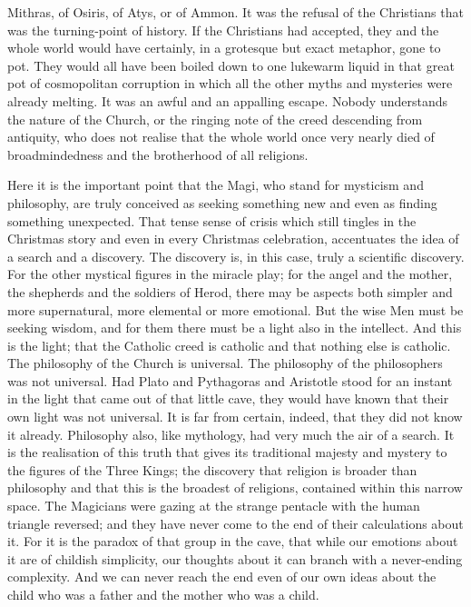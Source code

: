 Mithras, of Osiris, of Atys, or of Ammon. It was the refusal of the Christians that was the turning-point of history. If the Christians had accepted, they and the whole world would have certainly, in a grotesque but exact metaphor, gone to pot. They would all have been boiled down to one lukewarm liquid in that great pot of cosmopolitan corruption in which all the other myths and mysteries were already melting. It was an awful and an appalling escape. Nobody understands the nature of the Church, or the ringing note of the creed descending from antiquity, who does not realise that the whole world once very nearly died of broadmindedness and the brotherhood of all religions.

Here it is the important point that the Magi, who stand for mysticism and philosophy, are truly conceived as seeking something new and even as finding something unexpected. That tense sense of crisis which still tingles in the Christmas story and even in every Christmas celebration, accentuates the idea of a search and a discovery. The discovery is, in this case, truly a scientific discovery. For the other mystical figures in the miracle play; for the angel and the mother, the shepherds and the soldiers of Herod, there may be aspects both simpler and more supernatural, more elemental or more emotional. But the wise Men must be seeking wisdom, and for them there must be a light also in the intellect. And this is the light; that the Catholic creed is catholic and that nothing else is catholic. The philosophy of the Church is universal. The philosophy of the philosophers was not universal. Had Plato and Pythagoras and Aristotle stood for an instant in the light that came out of that little cave, they would have known that their own light was not universal. It is far from certain, indeed, that they did not know it already. Philosophy also, like mythology, had very much the air of a search. It is the realisation of this truth that gives its traditional majesty and mystery to the figures of the Three Kings; the discovery that religion is broader than philosophy and that this is the broadest of religions, contained within this narrow space. The Magicians were gazing at the strange pentacle with the human triangle reversed; and they have never come to the end of their calculations about it. For it is the paradox of that group in the cave, that while our emotions about it are of childish simplicity, our thoughts about it can branch with a never-ending complexity. And we can never reach the end even of our own ideas about the child who was a father and the mother who was a child.

